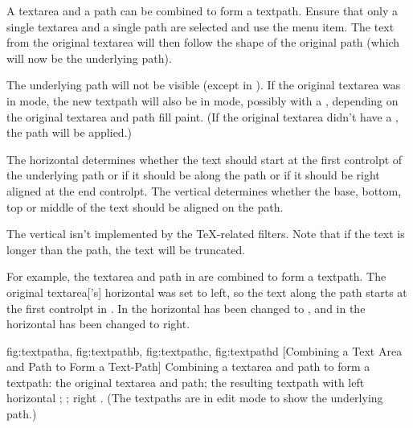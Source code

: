 
A \gls{textarea} and a \gls{path} can be combined to form a
\gls{textpath}. Ensure that only a single \gls{textarea} and a
single \gls{path} are selected and use the 
menu item. The text from the original \gls{textarea} will then follow
the shape of the original path (which will now be the underlying
path).

The underlying path will not be visible (except in \editpathmode).
If the original \gls*{textarea} was in  mode, the new
\gls*{textpath} will also be in  mode, possibly with a 
, depending on the original \gls*{textarea} and \gls*{path}
fill paint. (If the original \gls*{textarea} didn't have a
, the \gls*{path}  will be applied.)

The horizontal  determines
whether the text should start at the first \gls{controlpt} of the
underlying path or if it should be  along the path or if
it should be right aligned at the end \gls*{controlpt}. The vertical
 determines whether the base, bottom, top or middle of the
text should be aligned on the path. 

\begin{important}
The vertical  isn't implemented by the
 \TeX-related filters. Note that if the text is
longer than the path, the text will be truncated.
\end{important}

For example, the \gls{textarea} and \gls{path} in
 are combined to form a \gls*{textpath}.
The original \gls*{textarea}['s] horizontal  was
set to left, so the text along the path starts at the first
\gls{controlpt} in . In
 the horizontal  has been
changed to , and in  the
horizontal  has been changed to right.

{
 {fig:textpatha}{}{},
 {fig:textpathb}{}{},
 {fig:textpathc}{}{},
 {fig:textpathd}{}{}
}
[Combining a Text Area and Path to Form a Text-Path]
{Combining a \gls{textarea} and \gls{path} to form a \gls{textpath}:
 the original \gls{textarea} and \gls{path};
 the resulting \gls{textpath} with left horizontal 
; 
  ; 
 right . 
(The \glspl{textpath} are in edit mode to show the underlying path.)}

